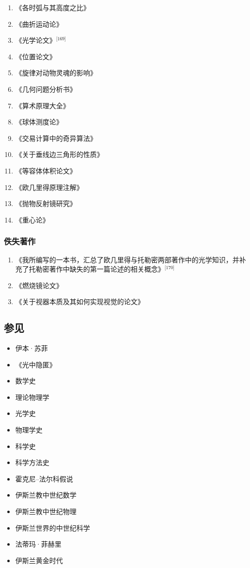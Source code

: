\begin{enumerate}
\item 《各时弧与其高度之比》
\item 《曲折运动论》
\item 《光学论文》\(^\text{[169]}\)
\item 《位置论文》
\item 《旋律对动物灵魂的影响》
\item 《几何问题分析书》
\item 《算术原理大全》
\item 《球体测度论》
\item 《交易计算中的奇异算法》
\item 《关于垂线边三角形的性质》
\item 《等容体体积论文》
\item 《欧几里得原理注解》
\item 《抛物反射镜研究》
\item 《重心论》
\end{enumerate}
\subsubsection{佚失著作}
\begin{enumerate}
\item 《我所编写的一本书，汇总了欧几里得与托勒密两部著作中的光学知识，并补充了托勒密著作中缺失的第一篇论述的相关概念》\(^\text{[170]}\)
\item 《燃烧镜论文》
\item 《关于视器本质及其如何实现视觉的论文》
\end{enumerate}
\subsection{参见}
\begin{itemize}
\item 伊本·苏菲
\item 《光中隐匿》
\item 数学史
\item 理论物理学
\item 光学史
\item 物理学史
\item 科学史
\item 科学方法史
\item 霍克尼–法尔科假说
\item 伊斯兰教中世纪数学
\item 伊斯兰教中世纪物理
\item 伊斯兰世界的中世纪科学
\item 法蒂玛·菲赫里
\item 伊斯兰黄金时代
\end{itemize}
